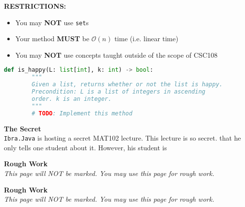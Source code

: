 \documentclass[letterpaper,12pt,addpoints]{exam}
\begin{document}
\begin{questions}
    \begin{center}
        
        \textbf{RESTRICTIONS:}
        \begin{itemize}
            \item You may \textbf{NOT} use \texttt{set}s
            \item Your method \textbf{MUST} be $\mathcal{O}(n)$ time (i.e. linear time)
            \item You may \textbf{NOT} use concepts taught outside of the scope of CSC108
        \end{itemize}
    \end{center}

    \begin{lstlisting}[language=Python, style=mystyle]
    def is_happy(L: list[int], k: int) -> bool:
        """
        Given a list, returns whether or not the list is happy.
        Precondition: L is a list of integers in ascending 
        order. k is an integer.
        """
        # TODO: Implement this method
    \end{lstlisting}

    \clearpage
    \question[10] \textbf{The Secret} \\
    \texttt{Ibra.Java} is hosting a secret MAT102 lecture. This lecture is so secret. that he only tells one student about it. However, his student is 


    \end{questions}

    \clearpage
    \begin{center}
        \textbf{Rough Work}\\
        \textit{This page will NOT be marked. You may use this page for rough work.}
    \end{center}

    \clearpage
    \begin{center}
        \textbf{Rough Work}\\
        \textit{This page will NOT be marked. You may use this page for rough work.}
    \end{center}
\end{document}

